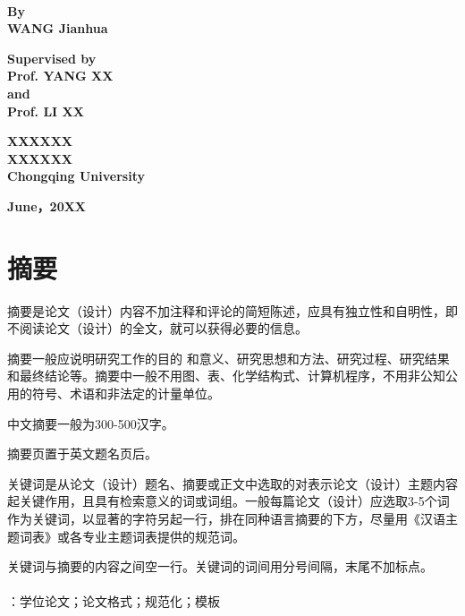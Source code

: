 \documentclass[UTF8,a4paper,12pt]{ctexart}
\numberwithin{equation}{section}
\begin{document}
~\\
\renewcommand{\headrulewidth}{1pt}
\begin{figure}[htb] 
  \centering
     \end{figure}
     

\setmainfont{Times New Roman}
\begin{center}
\textbf{By}  \\
\textbf{WANG Jianhua }
\end{center}

\begin{center}
\textbf{Supervised by}\\
\textbf{Prof. YANG XX}\\
\textbf{and}\\
\textbf{Prof. LI XX}
\end{center}

\begin{center}
\textbf{XXXXXX}\\ %
\textbf{XXXXXX}\\ %
\textbf{Chongqing University}
\end{center}

\begin{center}
\textbf{June，20XX}
\end{center}


\newpage
\pagestyle{fancy}





\section*{摘\quad 要}

摘要是论文（设计）内容不加注释和评论的简短陈述，应具有独立性和自明性，即不阅读论文（设计）的全文，就可以获得必要的信息。\par 
摘要一般应说明研究工作的目的 和意义、研究思想和方法、研究过程、研究结果和最终结论等。摘要中一般不用图、表、化学结构式、计算机程序，不用非公知公用的符号、术语和非法定的计量单位。\par 
中文摘要一般为300-500汉字。\par 
摘要页置于英文题名页后。 \par 
关键词是从论文（设计）题名、摘要或正文中选取的对表示论文（设计）主题内容起关键作用，且具有检索意义的词或词组。一般每篇论文（设计）应选取3-5个词作为关键词，以显著的字符另起一行，排在同种语言摘要的下方，尽量用《汉语主题词表》或各专业主题词表提供的规范词。\par 
关键词与摘要的内容之间空一行。关键词的词间用分号间隔，末尾不加标点。\\
~\\
：学位论文；论文格式；规范化；模板\\
\end{document}
